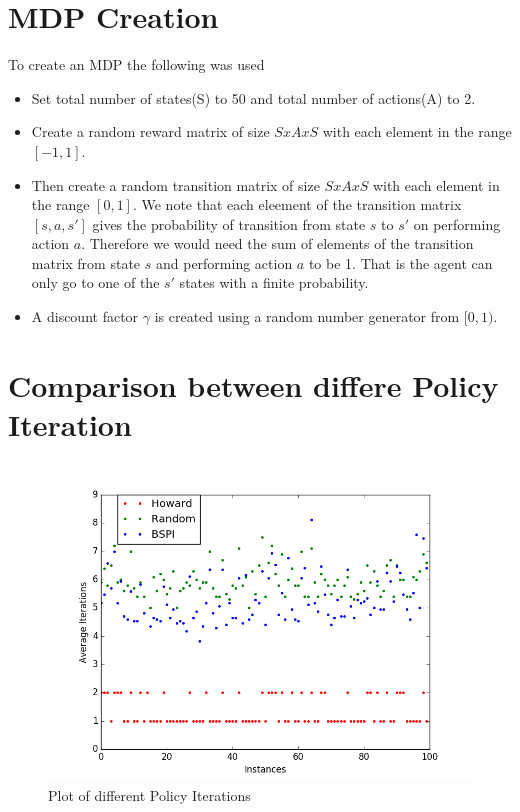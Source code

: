 \documentclass{article}
\begin{document}
\section{MDP Creation}
To create an MDP the following was used
\begin{itemize}
\item Set total number of states(S) to 50 and total number of actions(A) to 2.
\item Create a random reward matrix of size $S x A x S$ with each element in the range $[-1, 1]$.
\item Then create a random transition matrix of size $S x A x S$ with each element in the range $[0,1]$. We note that each eleement of the transition matrix $[s, a, s']$ gives the probability of transition from state $s$ to $s'$ on performing action $a$. Therefore we would need the sum of elements of the transition matrix from state $s$ and performing action $a$ to be 1. That is the agent can only go to one of the $s'$ states with a finite probability.
\item A discount factor $\gamma$ is created using a random number generator from $[0,1)$.
\end{itemize}

\section{Comparison between differe Policy Iteration}
\begin{figure}[H]
  \centering
  \includegraphics[scale=0.5]{images/Policy_Iteration_Plot}
  \caption{Plot of different Policy Iterations}
  \label{fig:1}
\end{figure}
\end{document}
